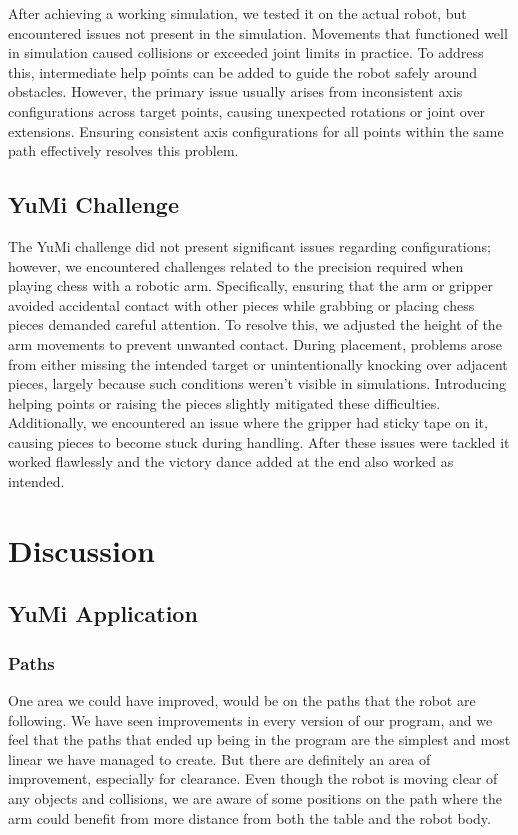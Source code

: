 \documentclass[a4paper,12pt]{article}
\begin{document}
After achieving a working simulation, we tested it on the actual robot, but encountered issues not present in the simulation. Movements that functioned well in simulation caused collisions or exceeded joint limits in practice. To address this, intermediate help points can be added to guide the robot safely around obstacles. However, the primary issue usually arises from inconsistent axis configurations across target points, causing unexpected rotations or joint over extensions. Ensuring consistent axis configurations for all points within the same path effectively resolves this problem.

\subsection{YuMi Challenge}
The YuMi challenge did not present significant issues regarding configurations; however, we encountered challenges related to the precision required when playing chess with a robotic arm. Specifically, ensuring that the arm or gripper avoided accidental contact with other pieces while grabbing or placing chess pieces demanded careful attention. To resolve this, we adjusted the height of the arm movements to prevent unwanted contact. During placement, problems arose from either missing the intended target or unintentionally knocking over adjacent pieces, largely because such conditions weren't visible in simulations. Introducing helping points or raising the pieces slightly mitigated these difficulties.
Additionally, we encountered an issue where the gripper had sticky tape on it, causing pieces to become stuck during handling. 
After these issues were tackled it worked flawlessly and the victory dance added at the end also worked as intended.

\section{Discussion}
\subsection{YuMi Application}
\subsubsection{Paths}
One area we could have improved, would be on the paths that the robot are following. We have seen improvements in every version of our program, and we feel that the paths that ended up being in the program are the simplest and most linear we have managed to create. But there are definitely an area of improvement, especially for clearance. Even though the robot is moving clear of any objects and collisions, we are aware of some positions on the path where the arm could benefit from more distance from both the table and the robot body.
\end{document}
